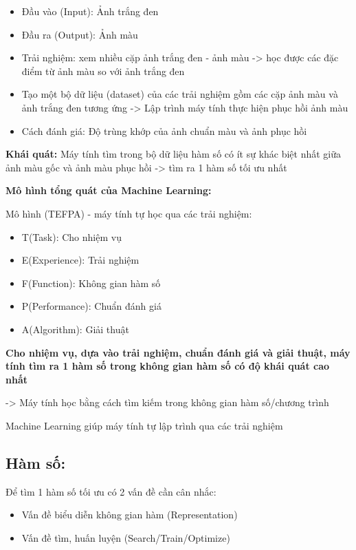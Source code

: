 \documentclass{article}
\begin{document}
\begin{itemize}
    \item Đầu vào (Input): Ảnh trắng đen
    \item Đầu ra (Output): Ảnh màu
    \item Trải nghiệm: xem nhiều cặp ảnh trắng đen - ảnh màu -> học được các đặc điểm từ ảnh màu so với ảnh trắng đen
    \item Tạo một bộ dữ liệu (dataset) của các trải nghiệm gồm các cặp ảnh màu và ảnh trắng đen tương ứng -> Lập trình máy tính thực hiện phục hồi ảnh màu
    \item Cách đánh giá: Độ trùng khớp của ảnh chuẩn màu và ảnh phục hồi
\end{itemize}
\textbf{Khái quát: }Máy tính tìm trong bộ dữ liệu hàm số có ít sự khác biệt nhất giữa ảnh màu gốc và ảnh màu phục hồi -> tìm ra 1 hàm số tối ưu nhất

\textbf{Mô hình tổng quát của Machine Learning:}

Mô hình (TEFPA) - máy tính tự học qua các trải nghiệm:
\begin{itemize}
    \item T(Task): Cho nhiệm vụ
    \item E(Experience): Trải nghiệm
    \item F(Function): Không gian hàm số
    \item P(Performance): Chuẩn đánh giá
    \item A(Algorithm): Giải thuật
\end{itemize}

\textbf{Cho nhiệm vụ, dựa vào trải nghiệm, chuẩn đánh giá và giải thuật, máy tính tìm ra 1 hàm số trong không gian hàm số có độ khái quát cao nhất}

-> Máy tính học bằng cách tìm kiếm trong không gian hàm số/chương trình

Machine Learning giúp máy tính tự lập trình qua các trải nghiệm

\subsection{Hàm số:}
Để tìm 1 hàm số tối ưu có 2 vấn đề cần cân nhắc:
\begin{itemize}
    \item Vấn đề biểu diễn không gian hàm (Representation)
    \item Vấn đề tìm, huấn luyện (Search/Train/Optimize)
\end{itemize}
\end{document}
